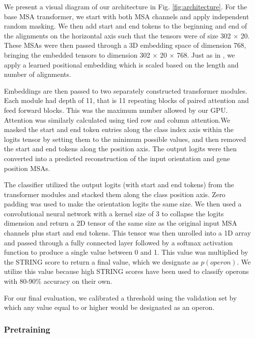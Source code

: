 \documentclass{article}
\begin{document}
We present a visual diagram of our architecture in Fig. \ref{fig:architecture}. For the base MSA transformer,  we start with both MSA channels and apply independent random masking. We then add start and end tokens to the beginning and end of the alignments on the horizontal axis such that the tensors were of size 302 \(\times\) 20. These MSAs were then passed through a 3D embedding space of dimension 768, bringing the embedded tensors to dimension 302 \(\times\) 20 \(\times\) 768. Just as in \citet{rao_msa_2021}, we apply a learned positional embedding which is scaled based on the length and number of alignments. 

Embeddings are then passed to two separately constructed transformer modules. Each module had depth of 11, that is 11 repeating blocks of paired attention and feed forward blocks. This was the maximum number allowed by our GPU. Attention was similarly calculated using tied row and column attention.We masked the start and end token entries along the class index axis within the logits tensor by setting them to the minimum possible values, and then removed the start and end tokens along the position axis. The output logits were then converted into a predicted reconstruction of the input orientation and gene position MSAs.

The classifier utilized the output logits (with start and end tokens) from the transformer modules and stacked them along the class position axis. Zero padding was used to make the orientation logits the same size. We then used a convolutional neural network with a kernel size of 3 to collapse the logits dimension and return a 2D tensor of the same size as the original input MSA channels plus start and end tokens. This tensor was then unrolled into a 1D array and passed through a fully connected layer followed by a softmax activation function to produce a single value between 0 and 1. This value was multiplied by the STRING score to return a final value, which we designate as $p(operon)$. We utilize this value because high STRING scores have been used to classify operons with 80-90\% accuracy on their own.

For our final evaluation, we calibrated a threshold using the validation set by which any value equal to or higher would be designated as an operon.

\subsubsection{Pretraining}
\end{document}
